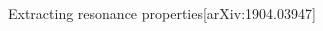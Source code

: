 \documentclass[aspectratio=169]{beamer}
\newcommand{\paper}[1]{{\scriptsize[#1]}}
\begin{document}
\begin{frame}{Extracting resonance properties}{\paper{arXiv:1904.03947}}
\begin{columns}
\begin{column}{0.49\textwidth}
\begin{overlayarea}{\textwidth}{\textheight}
        \end{overlayarea}
    \end{column}
\end{columns}
\end{frame}
\end{document}
